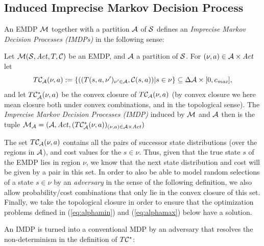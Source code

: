 \documentclass{llncs}
\begin{document}
\subsection{Induced Imprecise Markov Decision Process}


An EMDP $\mathcal{M}$ together with a partition $\mathcal{A}$ of $\mathcal{S}$ defines an  \emph{Imprecise Markov Decision
Processes (IMDPs)} in the following sense:




\begin{definition}
Let $\mathcal{M}(\mathcal{S},\mathit{Act},T,\mathcal{C})$ be an EMDP, and $\mathcal{A}$ a partition of $\mathcal{S}$.
For $(\nu,a)\in\mathcal{A}\times\mathit{Act}$ let
\begin{equation}
T\mathcal{C}_{\mathcal{A}}(\nu,a):=\{ ( (T(s,a,\nu')_{\nu'\in\mathcal{A}},\mathcal{C}(s,a))  | s\in\nu \}
\subseteq \Delta\mathcal{A}\times [0,c_{\emph{max}}],
\end{equation}
and let $T\mathcal{C}^*_{\mathcal{A}}(\nu,a)$ be the convex closure of $T\mathcal{C}_{\mathcal{A}}(\nu,a)$
(by convex closure we here mean closure both under  convex combinations, and in the
topological sense).
The
\emph{Imprecise Markov Decision Processes (IMDP)} induced by $\mathcal{M}$ and $\mathcal{A}$ then is the
tuple $\mathcal{M}_{\mathcal{A}}=(\mathcal{A},\mathit{Act},(T\mathcal{C}^*_{\mathcal{A}}(\nu,a))_{(\nu,a)\in\mathcal{A}\times\mathit{Act}})$
\end{definition}


The set $T\mathcal{C}_{\mathcal{A}}(\nu,a)$ contains all the pairs of successor
 state distributions (over the regions in $\mathcal{A}$), and cost values for the $s\in \nu$. Thus, given that
 the true state $s$ of the EMDP lies in region $\nu$, we know that the next state distribution and cost will
 be given by a pair in this set. In order to also be able to model random selections of a state $s\in\nu$
 by an \emph{adversary} in the sense of the following definition, we also allow probability/cost combinations
 that only lie in the convex closure of this set. Finally, we take the topological closure in order to ensure
 that the optimization problems defined in (\ref{eq:alphamin}) and (\ref{eq:alphamax}) below have a solution.

An IMDP is turned into a conventional MDP by an adversary that resolves the non-determinism
in the definition of $T\mathcal{C}^*$:
\end{document}
